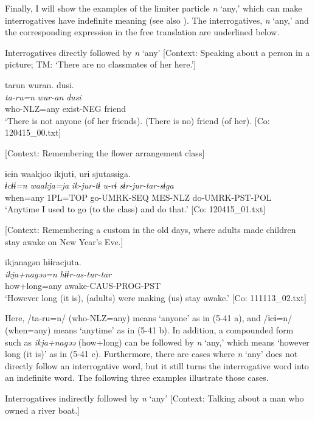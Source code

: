   Finally, I will show the examples of the limiter particle \textit{n} ‘any,’ which can make interrogatives have indefinite meaning (see also ). The interrogatives, \textit{n} ‘any,’ and the corresponding expression in the free translation are underlined below.

\ea \label{ex:5:41}   Interrogatives directly followed by \textit{n} ‘any’
 \ea \label{ex:5:41a} [Context: Speaking about a person in a picture; TM: ‘There are no classmates of her here.’]

\glll  tarun  wuran.  dusi.\\
\textit{ta-ru=n}  \textit{wur-an}  \textit{dusi}\\
who-NLZ=any  exist-NEG  friend\\
\glt ‘There is not anyone (of her friends). (There is no) friend (of her). [Co: 120415\_00.txt]

 \ex \label{ex:5:b} [Context: Remembering the flower arrangement class]

\glll  ɨcɨn  waakjoo  ikjutɨ,  urɨ  sjutassɨga.\\
\textit{ɨcɨɨ=n}  \textit{waakja=ja}  \textit{ik-jur-tɨ}  \textit{u-rɨ}  \textit{sɨr-jur-tar-sɨga}\\
when=any  1PL=TOP  go-UMRK-SEQ  MES-NLZ  do-UMRK-PST-POL\\
\glt ‘Anytime I used to go (to the class) and do that.’ [Co: 120415\_01.txt]

 \ex \label{ex:5:c} [Context: Remembering a custom in the old days, where adults made children stay awake on New Year’s Eve.]

\glll  ikjanagən  hɨɨracjuta.\\
\textit{ikja+nagəə=n}  \textit{hɨɨr-as-tur-tar}\\
how+long=any  awake-CAUS-PROG-PST\\
\glt ‘However long (it is), (adults) were making (us) stay awake.’ [Co: 111113\_02.txt]
\z
\z

Here, /ta-ru=n/ (who-NLZ=any) means ‘anyone’ as in (5-41 a), and /ɨcɨ=n/ (when=any) means ‘anytime’ as in (5-41 b). In addition, a compounded form such as \textit{ikja+nagəə} (how+long) can be followed by \textit{n} ‘any,’ which means ‘however long (it is)’ as in (5-41 c). Furthermore, there are cases where \textit{n} ‘any’ does not directly follow an interrogative word, but it still turns the interrogative word into an indefinite word. The following three examples illustrate those cases.

\ea \label{ex:5:42}   Interrogatives indirectly followed by \textit{n} ‘any’
 \ea \label{ex:5:42a} [Context: Talking about a man who owned a river boat.]

